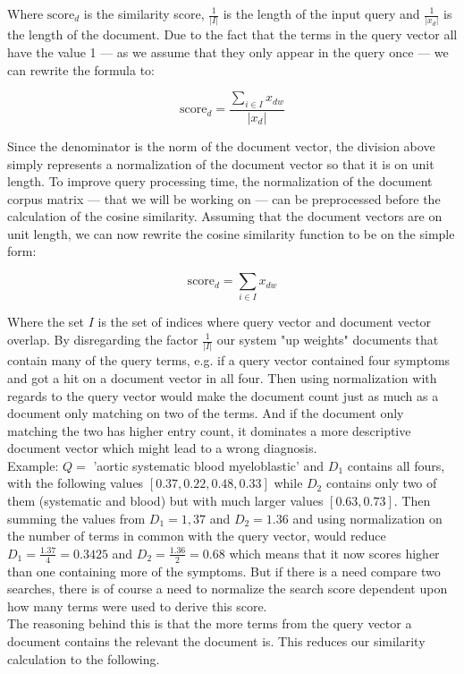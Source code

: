 Where $\textrm{score}_{d}$ is the similarity score, $\frac{1}{|I|}$ is the length
of the input query and $\frac{1}{|x_{d}|}$ is the length of the
document. Due to the fact that the terms in the query vector all have
the value 1 --- as we assume that they only appear in the query once --- we
can rewrite the formula to: 

\[
\textrm{score}_{d} = \frac{\sum_{i \in I} x_{dw}} {|x_{d}|}
\]

Since the denominator is the norm of the document vector, the division
above simply represents a normalization of the document vector so that
it is on unit length. To improve query processing time, the
normalization of the document corpus matrix --- that we will be working
on --- can be preprocessed before the calculation of the cosine
similarity. Assuming that the document vectors are on unit length, we
can now rewrite the cosine similarity function to be on the simple
form: 

\[
\textrm{score}_{d} =  \sum_{i \in I} x_{dw}
\]

Where the set $I$ is the set of indices where query vector and
document vector overlap. By disregarding the factor $\frac{1}{|I|}$
our system "up weights" documents that contain many of the query
terms, e.g. if a query vector contained four symptoms and got a hit on
a document vector in all four. Then using normalization with regards
to the query vector would make the document count just as much as a
document only matching on two of the terms. And if the document only
matching the two has higher entry count, it dominates a more
descriptive document vector which might lead to a wrong diagnosis.\\

Example: $Q =$ 'aortic systematic blood myeloblastic' and $D_{1}$
contains all fours, with the following values $[0.37, 0.22, 0.48,
0.33]$ while $D_{2}$ contains only two of them (systematic and blood)
but with much larger values $[0.63, 0.73]$. Then summing the values
from $D_1 = 1,37$ and $D_2 = 1.36$ and using normalization on the
number of terms in common with the query vector, would reduce $D_1 =
\frac{1.37}{4} = 0.3425$ and $D_2 = \frac{1.36}{2} = 0.68$ which means
that it now scores higher than one containing more of the
symptoms. But if there is a need compare two searches, there is of
course a need to normalize the search score dependent upon how many
terms were used to derive this score. \\

The reasoning behind this is that the more terms from the query vector
a document contains the relevant the document is. This reduces our
similarity calculation to the following. 

